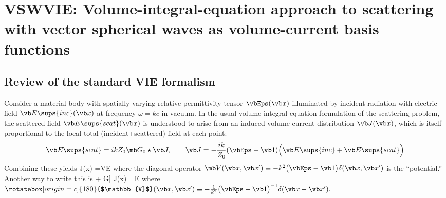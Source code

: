 \documentclass[letterpaper]{article}
\newcommand{\bbVInv}{\rotatebox[origin=c]{180}{$\mathbb{V}$}}
\begin{document}
\newpage
\section{VSWVIE: Volume-integral-equation approach to scattering with vector spherical waves as volume-current basis functions}

\subsection{Review of the standard VIE formalism}

Consider a material body with
spatially-varying relative permittivity tensor $\vbEps(\vb x)$
illuminated by incident radiation with
electric field $\vb E\sups{inc}(\vb x)$
at frequency $\omega=kc$ in vacuum.
In the usual volume-integral-equation formulation of the
scattering problem, the scattered field $\vb E\sups{scat}(\vb x)$
is understood to arise from an induced volume current
distribution $\vb J(\vb x)$, which is itself proportional
to the local total (incident+scattered) field at each 
point:
$$
 \vb E\sups{scat} = ikZ_0 \mb G_0 \star \vb J,
 \qquad
 \vb J=-\frac{ik}{Z_0}(\vbEps-\vb 1)
         \Big(\vb E\sups{inc} + \vb E\sups{scat}\Big)
$$
Combining these yields
{\Big[ \vb 1 + \mb V \mb G\Big]\star
\vb J(\vb x) =\mb V\vb E
}
where the diagonal operator 
$\mb V(\vb x,\vb x^\prime)\equiv -k^2 \big(\vbEps-\vb 1\big)\delta(\vb x,\vb x^\prime)$ 
is the ``potential.'' Another way to write this is 
{\Big[ \bbVInv + \mb G\Big]\star 
\vb J(\vb x) =\vb E
}
where 
$ \bbVInv(\vb x,\vb x^\prime) 
 \equiv -\frac{1}{k^2}\big(\vbEps-\vb 1\big)^{-1}\delta(\vb x-\vb x^\prime).$
\end{document}
